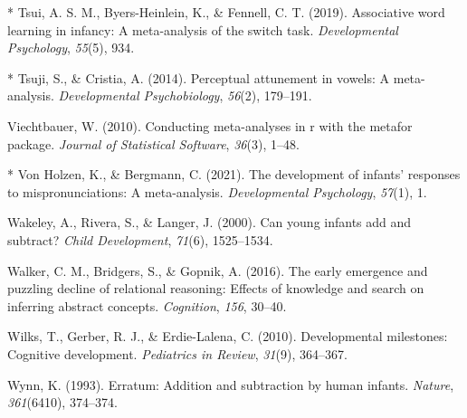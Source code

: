\documentclass[10pt, letterpaper]{article}
\newenvironment{CSLReferences}%
  {}%
  {\par}
\begin{document}
\begin{CSLReferences}{1}{0}
\leavevmode{}%
* Tsui, A. S. M., Byers-Heinlein, K., \& Fennell, C. T. (2019).
Associative word learning in infancy: A meta-analysis of the switch
task. \emph{Developmental Psychology}, \emph{55}(5), 934.

\leavevmode{}%
* Tsuji, S., \& Cristia, A. (2014). Perceptual attunement in vowels: A
meta-analysis. \emph{Developmental Psychobiology}, \emph{56}(2),
179--191.

\leavevmode{}%
Viechtbauer, W. (2010). Conducting meta-analyses in r with the metafor
package. \emph{Journal of Statistical Software}, \emph{36}(3), 1--48.

\leavevmode{}%
* Von Holzen, K., \& Bergmann, C. (2021). The development of infants'
responses to mispronunciations: A meta-analysis. \emph{Developmental
Psychology}, \emph{57}(1), 1.

\leavevmode{}%
Wakeley, A., Rivera, S., \& Langer, J. (2000). Can young infants add and
subtract? \emph{Child Development}, \emph{71}(6), 1525--1534.

\leavevmode{}%
Walker, C. M., Bridgers, S., \& Gopnik, A. (2016). The early emergence
and puzzling decline of relational reasoning: Effects of knowledge and
search on inferring abstract concepts. \emph{Cognition}, \emph{156},
30--40.

\leavevmode{}%
Wilks, T., Gerber, R. J., \& Erdie-Lalena, C. (2010). Developmental
milestones: Cognitive development. \emph{Pediatrics in Review},
\emph{31}(9), 364--367.

\leavevmode{}%
Wynn, K. (1993). Erratum: Addition and subtraction by human infants.
\emph{Nature}, \emph{361}(6410), 374--374.

\end{CSLReferences}


\end{document}
